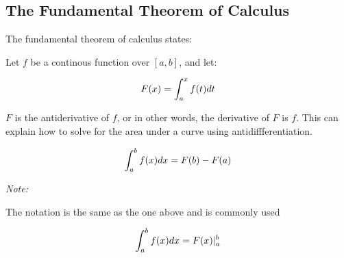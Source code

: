 \documentclass[12pt]{article}
\begin{document}
        \subsection{The Fundamental Theorem of Calculus}

        The fundamental theorem of calculus states:

        Let $f$ be a continous function over $[a, b]$, and let:

        \[
            F(x) = \int_a^x f(t) \space dt    
        \]

        $F$ is the antiderivative of $f$, or in other words, the derivative of $F$ is $f$. This can 
        explain how to solve for the area under a curve using antidiffferentiation.

        \[
            \int_a^b f(x) \space dx = F(b) - F(a)    
        \]

        \noindent \textit{Note:}

        The notation is the same as the one above and is commonly used

        \[
            \int_a^b f(x) \space dx = F(x) {|}_a^b   
        \]
\end{document}
